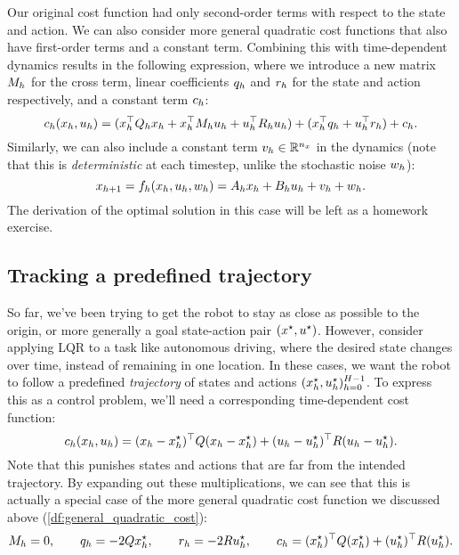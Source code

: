 \documentclass[\main/main]{subfiles}
\begin{document}
Our original cost function had only second-order terms with respect to the state and action. We can also consider more general quadratic cost functions that also have first-order terms and a constant term. Combining this with
time-dependent dynamics results in the following expression, where we introduce a new matrix $M_h$ for the cross term, linear coefficients $q_h$ and $r_h$ for the state and action respectively, and a constant term $c_h$:
\begin{equation}
    c_h(x_h, u_h) = ( x_h^\top Q_h x_h + x_h^\top M_h u_h + u_h^\top R_h u_h ) + (x_h^\top q_h + u_h^\top r_h) + c_h.
    \label{df:general_quadratic_cost}
\end{equation}
Similarly, we can also include a constant term $v_h \in \mathbb{R}^{n_x}$ in the dynamics (note that this is \emph{deterministic} at each timestep, unlike the stochastic noise $w_h$):
\[
    x_{h+1} = f_h(x_h, u_h, w_h) = A_h x_h + B_h u_h + v_h + w_h.
\]
The derivation of the optimal solution in this case will be left as a homework exercise.


\subsection{Tracking a predefined trajectory}

So far, we've been trying to get the robot to stay as close as possible to the origin, or more generally a goal state-action pair $(x^\star, u^\star)$.
However, consider applying LQR to a task like autonomous driving, where the desired state changes over time, instead of remaining in one location.
In these cases, we want the robot to follow a predefined \emph{trajectory} of
states and actions $(x_h^\star, u_h^\star)_{h=0}^{H-1}$. To express this as a control problem, we'll need a corresponding time-dependent cost function:
\[
    c_h(x_h, u_h) = (x_h - x^\star_h)^\top Q (x_h - x^\star_h) + (u_h - u^\star_h)^\top R (u_h - u^\star_h).
\]
Note that this punishes states and actions that are far from the intended trajectory. By expanding out these multiplications, we can see that this is actually a special case of the more general quadratic cost function we discussed above (\autoref{df:general_quadratic_cost}): \[
    M_h = 0, \qquad q_h = -2Q x^\star_h, \qquad r_h = -2R u^\star_h, \qquad c_h = (x^\star_h)^\top Q (x^\star_h) + (u^\star_h)^\top R (u^\star_h).
\]
\end{document}

